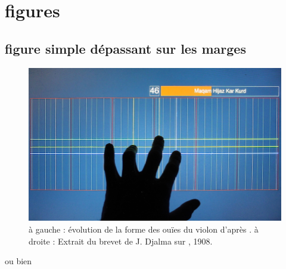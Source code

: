 \section*{figures}

\subsection*{figure simple dépassant sur les marges}

\begin{figure}[htb]
	\centerline{
		\includegraphics[width=1.2\textwidth]{gfx/06_visual_representation/mpTUI_pitchgrid_72dpi.png}
	}
	\caption{à gauche : évolution de la forme des ouïes du violon d'après \cite{nia_evolution_2015}. à droite : Extrait du brevet de J. Djalma sur , 1908.}
	\label{fig:sandbox:single}
\end{figure}

ou bien

\begin{center}
\end{center}

